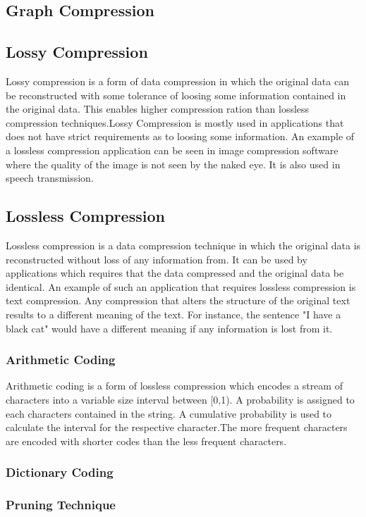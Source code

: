 \subsection{Graph Compression}

\subsection{Lossy Compression}

Lossy compression is a form of data compression in which the original data can be reconstructed with some tolerance of loosing some information contained in the original data. This enables higher compression ration than lossless compression techniques.Lossy Compression is mostly used in applications that does not have strict requirements as to loosing some information. An example of a lossless compression application can be seen in image compression software where the quality of the image is not seen by the naked eye. It is also used in speech transmission. 

\subsection{Lossless Compression}
Lossless compression is a data compression technique in which the original data is reconstructed without loss of any information from. It can be used by applications which requires that the data compressed and the original data be identical. An example of such an application that requires lossless compression is text compression.  Any compression that alters the structure of the original text results to a different meaning of the text. For instance, the sentence "I have a black cat" would have a different meaning if any information is lost from it.



\subsubsection{Arithmetic Coding}

Arithmetic coding is a form of lossless compression which encodes a stream of characters into a variable size interval between [0,1). A probability is assigned to each characters contained in the string. A cumulative probability is used to calculate the interval for the respective character.The more frequent characters are encoded with shorter codes than the less frequent characters. 

\subsubsection{Dictionary Coding}



\subsubsection{Pruning Technique} 